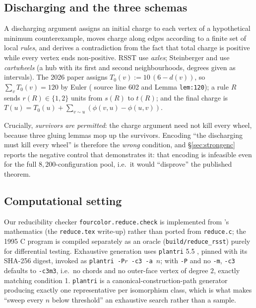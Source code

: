 \documentclass[11pt]{article}
\theoremstyle{definition}
\begin{document}
\subsection{Discharging and the three schemas}

A discharging argument assigns an initial charge to each vertex of a hypothetical
minimum counterexample, moves charge along edges according to a finite set of local
\emph{rules}, and derives a contradiction from the fact that total charge is
positive while every vertex ends non-positive. RSST use \emph{axles}; Steinberger
and \cite{nl4ct2026} use \emph{cartwheels} (a hub with its first and second
neighbourhoods, degrees given as intervals). The 2026 paper assigns
$T_0(v) := 10\,(6-d(v))$, so $\sum_v T_0(v) = 120$ by Euler
(\cite{nl4ct2026} source line 602 and Lemma \texttt{lem:120}); a rule $R$ sends
$r(R)\in\{1,2\}$ units from $s(R)$ to $t(R)$; and the final charge is
$T(u) = T_0(u) + \sum_{v\sim u}(\phi(v,u)-\phi(u,v))$.

Crucially, \emph{survivors are permitted}: the charge argument need not kill every
wheel, because three gluing lemmas mop up the survivors. Encoding ``the discharging
must kill every wheel'' is therefore the \emph{wrong} condition, and
\S\ref{sec:strongenc} reports the negative control that demonstrates it: that
encoding is infeasible even for the full $8{,}200$-configuration pool, i.e.\ it would
``disprove'' the published theorem.

\subsection{Computational setting}

Our reducibility checker \texttt{fourcolor.reduce.check} is implemented from
\cite{rsst-reduce}'s mathematics (the \texttt{reduce.tex} write-up) rather than
ported from \texttt{reduce.c}; the 1995 C program is compiled separately as an
oracle (\texttt{build/reduce\_rsst}) purely for differential testing. Exhaustive
generation uses \texttt{plantri} 5.5 \cite{brinkmann2007}, pinned with its
SHA-256 digest, invoked as \texttt{plantri -P$r$ -c3 -a $n$}; with \texttt{-P} and
no \texttt{-m}, \texttt{-c3} defaults to \texttt{-c3m3}, i.e.\ no chords and no
outer-face vertex of degree $2$, exactly matching condition 1. \texttt{plantri} is a
canonical-construction-path generator producing exactly one representative per
isomorphism class, which is what makes ``sweep every $n$ below threshold'' an
exhaustive search rather than a sample.
\end{document}
